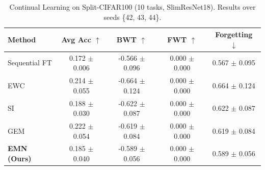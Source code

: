 \begin{table}[t]
\centering
\caption{Continual Learning on Split-CIFAR100 (10 tasks, SlimResNet18). Results over seeds \{42, 43, 44\}.}
\label{tab:continual_learning}
\begin{tabular}{lcccc}
\toprule
Method & Avg Acc $\uparrow$ & BWT $\uparrow$ & FWT $\uparrow$ & Forgetting $\downarrow$ \\
\midrule
Sequential FT & 0.172 $\pm$ 0.006 & -0.566 $\pm$ 0.096 & 0.000 $\pm$ 0.000 & 0.567 $\pm$ 0.095 \\
EWC & 0.214 $\pm$ 0.055 & -0.664 $\pm$ 0.124 & 0.000 $\pm$ 0.000 & 0.664 $\pm$ 0.124 \\
SI & 0.188 $\pm$ 0.030 & -0.622 $\pm$ 0.087 & 0.000 $\pm$ 0.000 & 0.622 $\pm$ 0.087 \\
GEM & 0.222 $\pm$ 0.054 & -0.619 $\pm$ 0.084 & 0.000 $\pm$ 0.000 & 0.619 $\pm$ 0.084 \\
\textbf{EMN (Ours)} & 0.185 $\pm$ 0.040 & -0.589 $\pm$ 0.056 & 0.000 $\pm$ 0.000 & 0.589 $\pm$ 0.056 \\
\bottomrule
\end{tabular}
\end{table}
